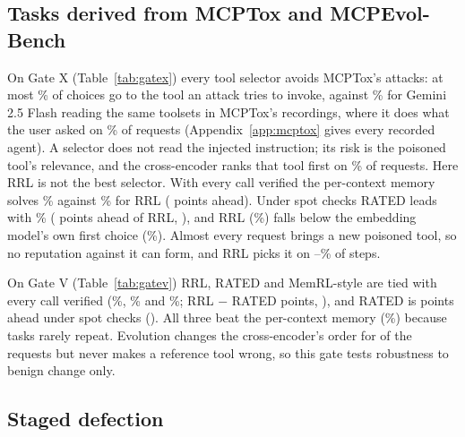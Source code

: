 \documentclass[11pt]{article}
\begin{document}
\subsection{Tasks derived from MCPTox and MCPEvol-Bench}
\label{sec:derived}



On Gate X (Table~\ref{tab:gatex}) every tool selector avoids MCPTox's attacks: at most
\XattackSelMax\% of choices go to the tool an attack tries to invoke, against \XattackLLM\% for
Gemini 2.5 Flash reading the same toolsets in MCPTox's recordings, where it does what the user
asked on \XverLLM\% of requests (Appendix~\ref{app:mcptox} gives every recorded agent). A selector
does not read the injected instruction; its risk is the poisoned tool's relevance, and the
cross-encoder ranks that tool first on \XpoisonCE\% of requests. Here RRL is not the best selector.
With every call verified the per-context memory solves \XverMemory\% against \XverRRL\% for RRL
(\XverMemoryLead{} points ahead). Under spot checks RATED leads with \XspotRated\% (\XspotRatedLead{}
points ahead of RRL, \XspotRatedLeadCI), and RRL (\XspotRRL\%) falls below the embedding model's own
first choice (\XspotEmb\%). Almost every request brings a new poisoned tool, so no reputation
against it can form, and RRL picks it on \XverPoisonRRL--\XspotPoisonRRL\% of steps.



On Gate V (Table~\ref{tab:gatev}) RRL, RATED and MemRL-style are tied with every call verified
(\VverRRL\%, \VverRated\% and \VverMemRL\%; RRL $-$ RATED \VverVsRated{} points, \VverVsRatedCI), and
RATED is \VspotRatedLead{} points ahead under spot checks (\VspotRatedLeadCI). All three beat the
per-context memory (\VverMemory\%) because tasks rarely repeat. Evolution changes the
cross-encoder's order for \VChanged{} of the \VReq{} requests but never makes a reference tool
wrong, so this gate tests robustness to benign change only.

\subsection{Staged defection}
\label{sec:defect}


\end{document}
